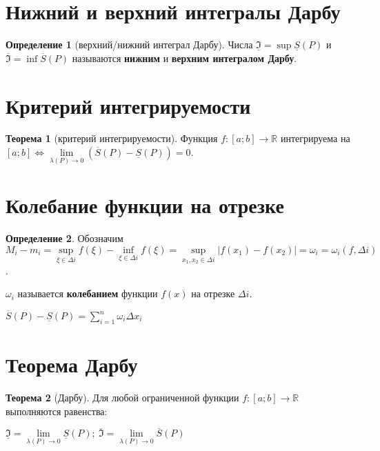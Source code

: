 \documentclass{report}
\theoremstyle{definition}
\newtheorem*{definition}{Определение}
\newtheorem*{theorem}{Теорема}
\begin{document}
\section{Нижний и верхний интегралы Дарбу}

\begin{definition}[верхний/нижний интеграл Дарбу]
    Числа $\underline{\mathfrak{I}}=\sup\underline{S}(P)$ и $\overline{\mathfrak{I}}=\inf\overline{S}(P)$ называются
    \textbf{нижним} и \textbf{верхним интегралом Дарбу}.
\end{definition}

\section{Критерий интегрируемости}

\begin{theorem}[критерий интегрируемости]
    Функция $f:[a;b]\rightarrow\mathbb{R}$ интегрируема на $[a;b] \iff \underset{\lambda (P)\rightarrow0}{\lim}
        (\overline{S}(P) - \underline{S}(P)) = 0$.
\end{theorem}

\section{Колебание функции на отрезке}

\begin{definition}
    Обозначим $M_{i} - m_{i} = \underset{\xi \in \Delta i}{\sup}f(\xi) - \underset{\xi\in\Delta i}{\inf}f(\xi)
        = \underset{x_{1},x_{2}\in\Delta i}{\sup}| f(x_{1}) - f(x_{2}) | = \omega_{i} = \omega_{i}(f,\Delta i)$.

    $\omega_{i}$ называется \textbf{колебанием} функции $f(x)$ на отрезке $\Delta i$.

    $\overline{S}(P) - \underline{S}(P) = \sum_{i = 1}^{n}\omega_{i}\Delta x_{i}$
\end{definition}

\section{Теорема Дарбу}

\begin{theorem}[Дарбу]
    Для любой ограниченной функции $f:[a;b]\rightarrow\mathbb{R}$ выполняются равенства:

    \begin{center}
        {\large $\underline{\mathfrak{I}} = \underset{\lambda(P)\rightarrow0}{\lim}\underline{S}(P); \ \overline{\mathfrak{I}}
                = \underset{\lambda(P)\rightarrow0}{\lim}\overline{S}(P)$}
    \end{center}
\end{theorem}
\end{document}
